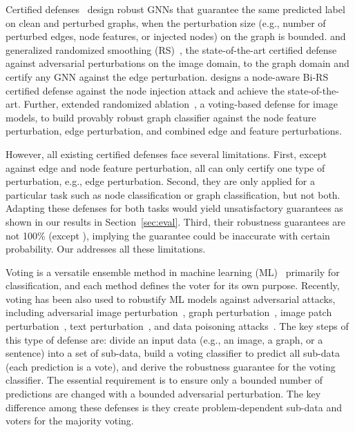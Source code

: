 Certified defenses~\cite{jin2020certified,jia2020certified,bojchevski2020efficient,wang2021certified,xia2024gnncert,lai2023nodeawarebismoothingcertifiedrobustness} design robust GNNs that guarantee the same predicted label on clean and perturbed graphs, when the perturbation size (e.g., number of perturbed edges, node features, or injected nodes) on the graph is bounded. 
\cite{bojchevski2020efficient} and~\cite{wang2021certified} generalized randomized smoothing (RS)~\cite{lecuyer2019certified,cohen2019certified,hong2022unicr}, the state-of-the-art certified defense against adversarial perturbations on the image domain, to the graph domain and certify any GNN against the edge perturbation. \cite{lai2023nodeawarebismoothingcertifiedrobustness} designs a node-aware Bi-RS certified defense against the node injection attack and achieve the state-of-the-art. 
Further, \cite{xia2024gnncert} extended randomized ablation~\cite{levine2020robustness}, a voting-based defense for image models, to build provably robust graph classifier against the node feature perturbation, edge perturbation, and combined edge and feature perturbations.   

However, all existing certified defenses face several  limitations. First, except \cite{xia2024gnncert} against edge and node feature perturbation, all can only 
certify 
one type of perturbation, e.g., edge perturbation. 
Second, they are only applied 
for a particular task such as node classification or graph classification, but not both. Adapting these defenses for both tasks would yield unsatisfactory guarantees as shown in our results in Section~\ref{sec:eval}. 
Third, their robustness guarantees are not 100\% (except \cite{xia2024gnncert}), implying  the guarantee could be inaccurate with certain probability. Our {\name} addresses all these limitations. 



\vspace{+0.05in}
Voting is a versatile ensemble method in machine learning (ML)~\cite{dietterich2000ensemble} primarily for classification, and each method defines the voter for its own purpose. 
Recently, voting has been also used to robustify ML models against adversarial attacks, including adversarial image perturbation~\cite{levine2020deep},  graph perturbation~\cite{xia2024gnncert,yang2024distributed,li2025provably}, image patch perturbation~\cite{levine2020randomized,xiang2021patchguard}, text perturbation~\cite{pei2023textguard,zhang2024text}, and data poisoning attacks~\cite{jia2021intrinsic,jia2022certified}.
The key steps of this type of defense are: divide an input data (e.g., an image, a graph, or a sentence) into a set of sub-data, build a voting classifier to predict all sub-data (each prediction is a vote), and derive the robustness guarantee for the voting classifier. 
The essential requirement is to ensure only a bounded number of predictions are changed with a bounded adversarial perturbation. 
The key difference among these defenses is they create problem-dependent sub-data and voters for the majority voting. 



